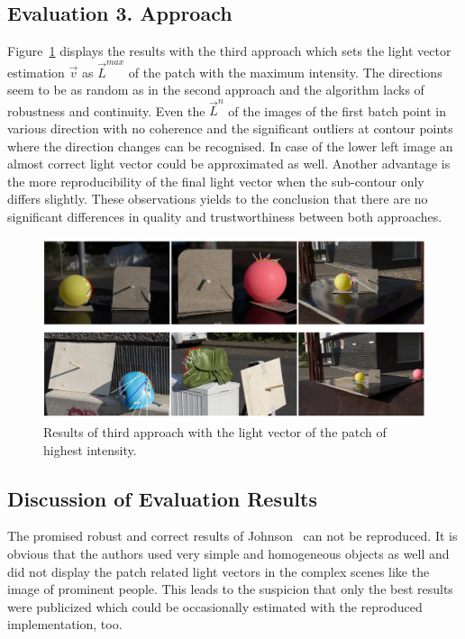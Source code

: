 \subsection{Evaluation 3. Approach}
Figure~\ref{fig:highRes} displays the results with the third approach which sets the light vector estimation $\vec{v}$ as  $\vec{L}^{max}$ of the patch with the maximum intensity. The directions seem to be as random as in the second approach and the algorithm lacks of robustness and continuity. Even the $\vec{L}^n$ of the images of the first batch point in various direction with no coherence and the significant outliers at contour points where the direction changes can be recognised. In case of the lower left image an almost correct light vector could be approximated as well. Another advantage is the more reproducibility of the final light vector when the sub-contour only differs slightly. These observations yields to the conclusion that there are no significant differences in quality and trustworthiness between both approaches. 
\begin{figure}[H] 
	\center 
	\includegraphics[width=\linewidth]{Images/High_res.jpg}
	\caption[Bildunterschrift]{Results of third approach with the light vector of the patch of highest intensity.}	
	\label{fig:highRes}	
\end{figure}


\subsection{Discussion of Evaluation Results}

The promised robust and correct results of Johnson~\cite{Johnson} can not be reproduced. It is obvious that the authors used very simple and homogeneous objects as well and did not display the patch related light vectors in the complex scenes like the image of prominent people. This leads to the suspicion that only the best results were publicized which could be occasionally estimated with the reproduced implementation, too. 

